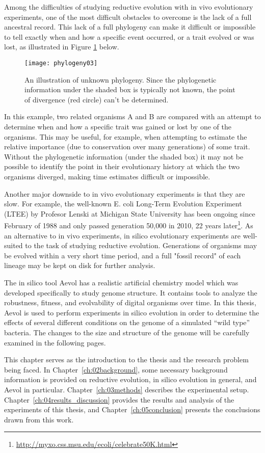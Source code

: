 Among the difficulties of studying reductive evolution with in vivo evolutionary experiments, one of the most difficult obstacles to overcome is the lack of a full ancestral record. This lack of a full phylogeny can make it difficult or impossible to tell exactly when and how a specific event occurred, or a trait evolved or was lost, as illustrated in Figure \ref{fig:phylogeny03} below. 
\begin{figure}[h]
\texttt{[image: phylogeny03]}
\centering
\caption[Unknown phylogeny]{An illustration of unknown phylogeny. Since the phylogenetic information under the shaded box is typically not known, the point of divergence (red circle) can't be determined.}
\label{fig:phylogeny03}
\end{figure}
In this example, two related organisms A and B are compared with an attempt to determine when and how a specific trait was gained or lost by one of the organisms. This may be useful, for example, when attempting to estimate the relative importance (due to conservation over many generations) of some trait. Without the phylogenetic information (under the shaded box) it may not be possible to identify the point in their evolutionary history at which the two organisms diverged, making time estimates difficult or impossible.

Another major downside to in vivo evolutionary experiments is that they are slow. For example, the well-known E. coli Long-Term Evolution Experiment (LTEE) by Profesor Lenski at Michigan State University has been ongoing since February of 1988 and only passed generation 50,000 in 2010, 22 years later\footnote{\url{http://myxo.css.msu.edu/ecoli/celebrate50K.html}}. As an alternative to in vivo experiments, in silico evolutionary experiments are well-suited to the task of studying reductive evolution. Generations of organisms may be evolved within a very short time period, and a full "fossil record" of each lineage may be kept on disk for further analysis. 

The in silico tool Aevol has a realistic artificial chemistry model which was developed specifically to study genome structure. It contains tools to analyze the robustness, fitness, and evolvability of digital organisms over time.  In this thesis, Aevol is used to perform experiments in silico evolution in order to determine the effects of several different conditions on the genome of a simulated ``wild type'' bacteria. The changes to the size and structure of the genome will be carefully examined in the following pages. 

This chapter serves as the introduction to the thesis and the research problem being faced. In Chapter~\ref{ch:02background}, some necessary background information is provided on reductive evolution, in silico evolution in general, and Aevol in particular. Chapter~\ref{ch:03methods} describes the experimental setup. Chapter~\ref{ch:04results_discussion}
provides the results and analysis of the experiments of this thesis, and Chapter~\ref{ch:05conclusion} presents the conclusions drawn from this work. 


